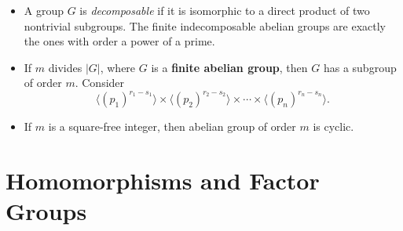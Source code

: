 \documentclass{article}
\begin{document}
\begin{itemize}
    \item A group $G$ is \textit{decomposable} if it is isomorphic to a direct product of two nontrivial subgroups. The finite indecomposable abelian groups are exactly the ones with order a power of a prime.
    \item If $m$ divides $|G|$, where $G$ is a \textbf{finite abelian group}, then $G$ has a subgroup of order $m$. Consider $$\langle (p_1)^{r_1 - s_1} \rangle \times \langle (p_2)^{r_2 - s_2} \rangle \times \cdots \times \langle (p_n)^{r_n - s_n} \rangle.$$
    \item If $m$ is a square-free integer, then abelian group of order $m$ is cyclic.
\end{itemize}

\section{Homomorphisms and Factor Groups}
\end{document}

